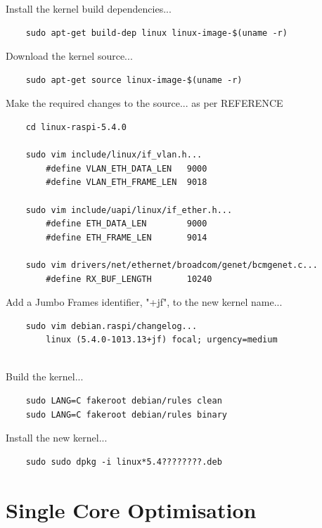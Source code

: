 \documentclass{article}
\begin{document}
Install the kernel build dependencies...

\begin{verbatim}
    sudo apt-get build-dep linux linux-image-$(uname -r)
\end{verbatim}

Download the kernel source...

\begin{verbatim}
    sudo apt-get source linux-image-$(uname -r)
\end{verbatim}

Make the required changes to the source... as per REFERENCE

\begin{verbatim}
    cd linux-raspi-5.4.0 

    sudo vim include/linux/if_vlan.h...
        #define VLAN_ETH_DATA_LEN   9000
        #define VLAN_ETH_FRAME_LEN  9018
    
    sudo vim include/uapi/linux/if_ether.h...
        #define ETH_DATA_LEN        9000
        #define ETH_FRAME_LEN       9014
    
    sudo vim drivers/net/ethernet/broadcom/genet/bcmgenet.c...
        #define RX_BUF_LENGTH       10240
\end{verbatim}

Add a Jumbo Frames identifier, "+jf", to the new kernel name...

\begin{verbatim}
    sudo vim debian.raspi/changelog...
        linux (5.4.0-1013.13+jf) focal; urgency=medium
        
\end{verbatim}

Build the kernel...

\begin{verbatim}
    sudo LANG=C fakeroot debian/rules clean
    sudo LANG=C fakeroot debian/rules binary
\end{verbatim}

Install the new kernel...

\begin{verbatim}
    sudo sudo dpkg -i linux*5.4????????.deb
\end{verbatim}





%
%
\section{Single Core Optimisation}
\end{document}
